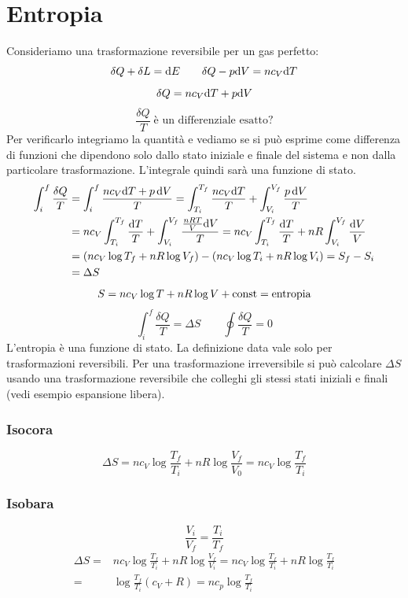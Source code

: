\section{Entropia}
Consideriamo una trasformazione reversibile per un gas perfetto:
\[\delta Q+\delta L=\mathrm{d} E\qquad \delta Q-p\mathrm{d} V=nc_V\mathrm{d} T\]
\[\delta Q=nc_V\mathrm{d} T+p\mathrm{d} V\]
\[\frac{\delta Q}{T}\;\text{è un differenziale esatto?}\]
Per verificarlo integriamo la quantità e vediamo se si può esprime come differenza di funzioni che dipendono solo dallo stato iniziale e finale del sistema e non dalla particolare trasformazione. L'integrale quindi sarà una funzione di stato.
\begin{align*}
   \int_i^f\frac{\delta Q}{T} & =\int_i^f\frac{nc_V\mathrm{d} T+p\,\mathrm{d} V}{T}=\int_{T_i}^{T_f}\frac{nc_V\mathrm{d} T}{T}+\int_{V_i}^{V_f}\frac{p\,\mathrm{d} V}{T}                                            \\
                              & =nc_V\int_{T_i}^{T_f}\frac{\mathrm{d} T}{T}+\int_{V_i}^{V_f}\frac{\frac{nRT}{V}\mathrm{d} V}{T}=nc_V\int_{T_i}^{T_f}\frac{\mathrm{d} T}{T}+nR\int_{V_i}^{V_f}\frac{\mathrm{d} V}{V} \\
                              & =(nc_V\log T_f+nR\log V_f)-(nc_V\log T_i+nR\log V_i)=S_f-S_i                                                                                            \\&=\Delta S
\end{align*}
\[S=nc_V\log T+nR\log V+\text{const}=\text{entropia}\]
\[\int_i^f\frac{\delta Q}{T}=\Delta S\qquad \oint\frac{\delta Q}{T}=0\]
L'entropia è una funzione di stato. La definizione data vale solo per trasformazioni reversibili. Per una trasformazione irreversibile si può calcolare $\Delta S$ usando una trasformazione reversibile che colleghi gli stessi stati iniziali e finali (vedi esempio espansione libera).
\subsubsection{Isocora}
\[\Delta S=nc_V\log\frac{T_f}{T_i}+nR\log\frac{V_f}{V_0}=nc_V\log\frac{T_f}{T_i}\]
\subsubsection{Isobara}
\[\frac{V_i}{V_f}=\frac{T_i}{T_f}\]
\begin{align*}
   \Delta S= & nc_V\log\frac{T_f}{T_i}+nR\log\frac{V_f}{V_i}=nc_V\log\frac{T_f}{T_i}+nR\log\frac{T_f}{T_i} \\
   =         & \log\frac{T_f}{T_i}(c_V+R)=nc_p\log\frac{T_f}{T_i}
\end{align*}
